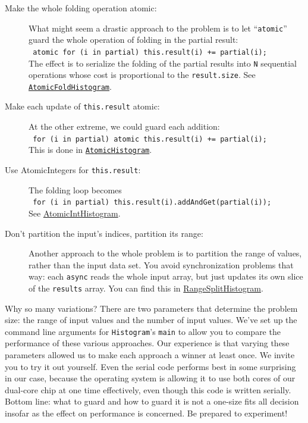 \begin{description}
\item[Make the whole folding operation atomic:]  What might seem a drastic
approach to the problem is to let ``{\tt atomic}'' guard the whole operation of folding in the partial result:\\
{\tt \hspace*{2em} atomic for (i in partial) this.result(i) += partial(i);}\\
The effect is to serialize the
folding of the partial results into {\tt N} sequential operations whose cost is proportional
to the {\tt result.size}.   
See 
\href{src/concurrency/AtomicFoldHistogram.x10}{\tt AtomicFoldHistogram}.

\item[Make each update of {\tt this.result} atomic:]  At the other extreme, we could
guard each addition:\\
{\tt \hspace*{2em} for (i in partial) atomic this.result(i) += partial(i); }\\
This is done in \href{src/concurrency/AtomicHistogram.x10}{\tt AtomicHistogram}.

\item[Use AtomicIntegers for {\tt this.result}:]  The folding loop becomes\\
{\tt \hspace*{2em} for (i in partial) this.result(i).addAndGet(partial(i)); }\\
See
\href{src/concurrency/AtomicIntHistogram.x10}{AtomicIntHistogram}.

\item[Don't partition the input's indices, partition its range:]
Another approach to the whole problem is to partition the range of values, rather than the
input data set.  You avoid synchronization problems that way: each {\tt async} reads
the whole input array, but just updates
its own slice of the {\tt results} array.  You can find this
in \href{src/concurrency/RangeSplitHistogram.x10}{Range\-Split\-His\-to\-gram}.
\end{description}

Why so many variations?  There are two parameters that determine the problem
size: the range of input values and the number of input values.  We've set up the
command line arguments for {\tt Histogram}'s {\tt main} to allow you to compare the
performance of these various approaches.  Our experience is that varying these
parameters allowed us to make each approach a winner at least once.  We invite you
to try it out yourself.  Even the serial code performs best in some surprising 
in our case, because the operating system is allowing it to use both cores of
our dual-core chip at one time effectively, even though this code is written
serially. Bottom line:  what to guard and how to guard it is not a one-size
fits all decision insofar as the effect on performance is concerned. Be
prepared to experiment!


